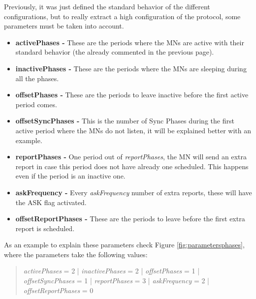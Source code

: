 Previously, it was just defined the standard behavior of the different configurations, but to really extract a high configuration of the protocol, some 
parameters must be taken into account.

\begin{itemize}
 \item \textbf{activePhases -} These are the periods where the \acp{MN} are active with their standard behavior (the already commented in the previous page).
 \item \textbf{inactivePhases -} These are the periods where the \acp{MN} are sleeping during all the phases.
 \item \textbf{offsetPhases -} These are the periods to leave inactive before the first active period comes.
 \item \textbf{offsetSyncPhases -} This is the number of Sync Phases during the first active period where the \acp{MN} do not listen, it will be explained 
better with an example.
 \item \textbf{reportPhases -} One period out of \textit{reportPhases}, the \ac{MN} will send an extra report in case this period does not have already one
scheduled. This happens even if the period is an inactive one.
 \item \textbf{askFrequency -} Every \textit{askFrequency} number of extra reports, these will have the ASK flag activated.
 \item \textbf{offsetReportPhases -} These are the periods to leave before the first extra report is scheduled.
\end{itemize}
 
As an example to explain these parameters check Figure \ref{fig:parametersphases}, where the parameters take the following values: 

\begin{quote}
 \textit{activePhases} = 2 | \textit{inactivePhases} = 2 | \textit{offsetPhases} = 1 | \textit{offsetSyncPhases} = 1 | \textit{reportPhases} = 3 
| \textit{askFrequency} = 2 | \textit{offsetReportPhases} = 0
\end{quote}

